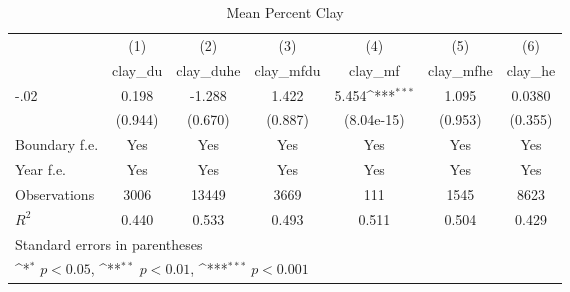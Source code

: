 \begin{table}[htbp]\centering
\def\sym#1{\ifmmode^{#1}\else\(^{#1}\)\fi}
\caption{Mean Percent Clay}
\begin{tabular}{l*{6}{c}}
\hline\hline
                    &\multicolumn{1}{c}{(1)}&\multicolumn{1}{c}{(2)}&\multicolumn{1}{c}{(3)}&\multicolumn{1}{c}{(4)}&\multicolumn{1}{c}{(5)}&\multicolumn{1}{c}{(6)}\\
                    &\multicolumn{1}{c}{clay\_du}&\multicolumn{1}{c}{clay\_duhe}&\multicolumn{1}{c}{clay\_mfdu}&\multicolumn{1}{c}{clay\_mf}&\multicolumn{1}{c}{clay\_mfhe}&\multicolumn{1}{c}{clay\_he}\\
\hline
-.02                &       0.198         &      -1.288         &       1.422         &       5.454\sym{***}&       1.095         &      0.0380         \\
                    &     (0.944)         &     (0.670)         &     (0.887)         &  (8.04e-15)         &     (0.953)         &     (0.355)         \\
[1em]
Boundary f.e.       &         Yes         &         Yes         &         Yes         &         Yes         &         Yes         &         Yes         \\
[1em]
Year f.e.           &         Yes         &         Yes         &         Yes         &         Yes         &         Yes         &         Yes         \\
\hline
Observations        &        3006         &       13449         &        3669         &         111         &        1545         &        8623         \\
\(R^{2}\)           &       0.440         &       0.533         &       0.493         &       0.511         &       0.504         &       0.429         \\
\hline\hline
\multicolumn{7}{l}{\footnotesize Standard errors in parentheses}\\
\multicolumn{7}{l}{\footnotesize \sym{*} \(p<0.05\), \sym{**} \(p<0.01\), \sym{***} \(p<0.001\)}\\
\end{tabular}
\end{table}
